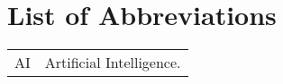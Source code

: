 





\section*{List of Abbreviations}
\begin{longtable}{cp{}}


AI      &Artificial Intelligence.\\

\end{longtable}


\renewcommand{\nomGname}{\textbf{\large Mathematical Symbols}}

\renewcommand{\nomXname}{\textbf{\large Superscripts}}
\renewcommand{\nomZname}{\textbf{\large Subscripts}}

